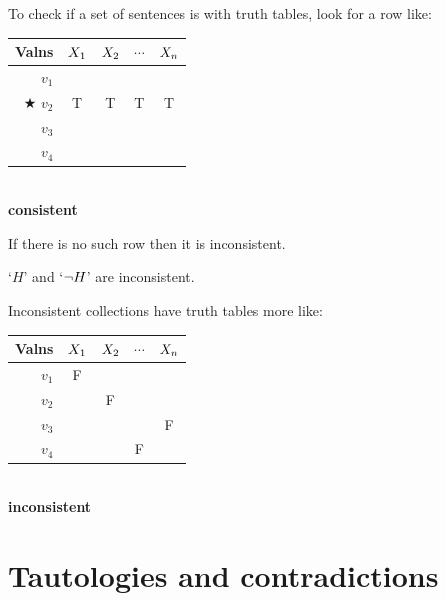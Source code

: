 \begin{highlighted}
		To check if a set of sentences is  with truth tables, look for a row like:
	
	
	\smallskip 
	\begin{center}
				\begin{tabular}{r | c |c |c | c}
					Valns & $X_1$ & $X_2$ & $\cdots$ & $X_n$\\
					\hline
					$v_1$&&&&\\
					$\bigstar$ $v_2$  & T & T & T & {T} \\
					$v_3$&&&&\\
					$v_4$&&&&
				\end{tabular}\\ \textbf{consistent}
\end{center}

If there is no such row then it is inconsistent. 
	
	
\end{highlighted}

`$H$' and `$\neg H$' are inconsistent. 

Inconsistent collections have truth tables more like: 
	\begin{center}
		\begin{tabular}{r | c |c |c | c}
			Valns & $X_1$ & $X_2$ & $\cdots$ & $X_n$\\
			\hline
			$v_1$&F&&&\\
			$v_2$  &&F&& \\
			$v_3$&&&&F\\
			$v_4$&&&F&
		\end{tabular}\\ \textbf{inconsistent}
	\end{center}




\section{Tautologies and contradictions}\label{sec:TautologiesAndContradictions}

